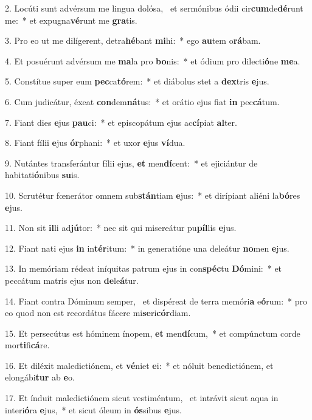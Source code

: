 2. Locúti sunt advérsum me lingua dolósa, \dag\  et sermónibus ódii cir\textbf{cum}de\textbf{dé}runt me:~*  et expugna\textbf{vé}runt me \textbf{gra}tis.\

3. Pro eo ut me dilígerent, detra\textbf{hé}bant \textbf{mi}hi:~*  ego \textbf{au}tem o\textbf{rá}bam.\

4. Et posuérunt advérsum me \textbf{ma}la pro \textbf{bo}nis:~*  et ódium pro dilecti\textbf{ó}ne \textbf{me}a.\

5. Constítue super eum \textbf{pec}ca\textbf{tó}rem:~*  et diábolus stet a \textbf{dex}tris \textbf{e}jus.\

6. Cum judicátur, éxeat \textbf{con}dem\textbf{ná}tus:~*  et orátio ejus fiat \textbf{in} pec\textbf{cá}tum.\

7. Fiant dies \textbf{e}jus \textbf{pau}ci:~*  et episcopátum ejus ac\textbf{cí}piat \textbf{al}ter.\

8. Fiant fílii \textbf{e}jus \textbf{ór}phani:~*  et uxor \textbf{e}jus \textbf{ví}dua.\

9. Nutántes transferántur fílii ejus, \textbf{et} men\textbf{dí}cent:~*  et ejiciántur de habitati\textbf{ó}nibus \textbf{su}is.\

10. Scrutétur fœnerátor omnem sub\textbf{stán}tiam \textbf{e}jus:~*  et dirípiant aliéni la\textbf{bó}res \textbf{e}jus.\

11. Non sit \textbf{il}li ad\textbf{jú}tor:~*  nec sit qui misereátur pu\textbf{píl}lis \textbf{e}jus.\

12. Fiant nati ejus \textbf{in} in\textbf{tér}itum:~*  in generatióne una deleátur \textbf{no}men \textbf{e}jus.\

13. In memóriam rédeat iníquitas patrum ejus in con\textbf{spéc}tu \textbf{Dó}mini:~*  et peccátum matris ejus non \textbf{de}le\textbf{á}tur.\

14. Fiant contra Dóminum semper, \dag\  et dispéreat de terra memóri\textbf{a} e\textbf{ó}rum:~*  pro eo quod non est recordátus fácere mi\textbf{se}ri\textbf{cór}diam.\

15. Et persecútus est hóminem ínopem, \textbf{et} men\textbf{dí}cum,~*  et compúnctum corde mor\textbf{ti}fi\textbf{cá}re.\

16. Et diléxit maledictiónem, et \textbf{vé}niet \textbf{e}i:~*  et nóluit benedictiónem, et elongábi\textbf{tur} ab \textbf{e}o.\

17. Et índuit maledictiónem sicut vestiméntum, \dag\  et intrávit sicut aqua in interi\textbf{ó}ra \textbf{e}jus,~*  et sicut óleum in \textbf{ós}sibus \textbf{e}jus.\

